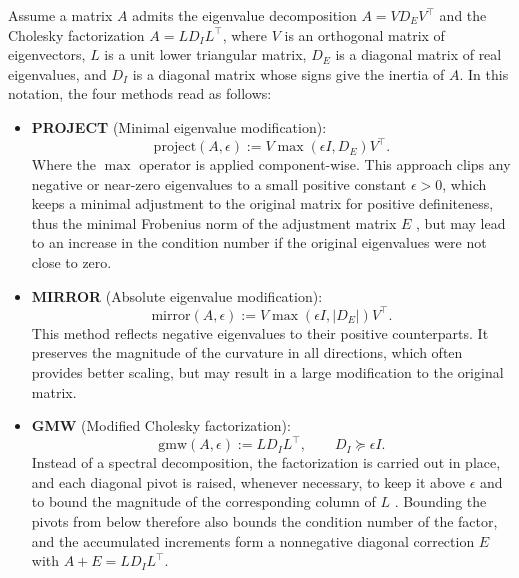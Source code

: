 \documentclass[class=scrbook, crop=false]{standalone}
\begin{document}
Assume a matrix $A$ admits the eigenvalue decomposition $A = V D_E V^\top$
and the Cholesky factorization $A = L D_I L^\top$,
where $V$ is an orthogonal matrix of eigenvectors, $L$ is a unit lower triangular matrix,
$D_E$ is a diagonal matrix of real eigenvalues, and $D_I$ is a diagonal matrix whose signs give the inertia of $A$.
In this notation, the four methods read as follows:
\begin{itemize}
    \item \textbf{PROJECT} (Minimal eigenvalue modification):
    \begin{equation*}
        \mathrm{project}(A, \epsilon) := V \max(\epsilon I, D_E) V^\top.
    \end{equation*}
    Where the $\max$ operator is applied component-wise. 
    This approach clips any negative or near-zero eigenvalues to a small positive constant $\epsilon > 0$,
    which keeps a minimal adjustment to the original matrix for positive definiteness, thus the minimal Frobenius norm of the adjustment matrix $E$ \cite{nocedal2006numerical},
    but may lead to an increase in the condition number if the original eigenvalues were not close to zero.

    \item \textbf{MIRROR} (Absolute eigenvalue modification):
    \begin{equation*}
        \mathrm{mirror}(A, \epsilon) := V \max(\epsilon I, |D_E|) V^\top.
    \end{equation*}
    This method reflects negative eigenvalues to their positive counterparts. 
    It preserves the magnitude of the curvature in all directions, which often provides better scaling,
    but may result in a large modification to the original matrix.

    \item \textbf{GMW} (Modified Cholesky factorization):
    \begin{equation*}
        \mathrm{gmw}(A, \epsilon) := L D_I L^\top, \qquad D_I \succeq \epsilon I.
    \end{equation*}
    Instead of a spectral decomposition, the factorization is carried out in place, and each diagonal pivot is raised,
    whenever necessary, to keep it above $\epsilon$ and to bound the magnitude of the corresponding column of $L$ \cite{gill1981practical}.
    Bounding the pivots from below therefore also bounds the condition number of the factor,
    and the accumulated increments form a nonnegative diagonal correction $E$ with $A + E = L D_I L^\top$.


\end{itemize}
\end{document}
